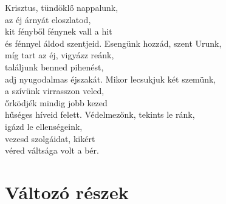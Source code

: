 \documentclass[twoside]{article}
\begin{document}

\begin{hymnstanzas}
    Krisztus, tündöklő nappalunk,\\
    az éj árnyát eloszlatod,\\
    kit fényből fénynek vall a hit\\
    és fénnyel áldod szentjeid.
\stanzabreak
    Esengünk hozzád, szent Urunk, \\
    míg tart az éj, vigyázz reánk, \\
    találjunk benned pihenést, \\
    adj nyugodalmas éjszakát.
\stanzabreak
    Mikor lecsukjuk két szemünk, \\
    a szívünk virrasszon veled, \\
    őrködjék mindig jobb kezed \\
    hűséges híveid felett.
\stanzabreak
    Védelmezőnk, tekints le ránk, \\
    igázd le ellenségeink, \\
    vezesd szolgáidat, kikért \\
    véred váltsága volt a bér.
\end{hymnstanzas}














\section*{Változó részek}
\end{document}
